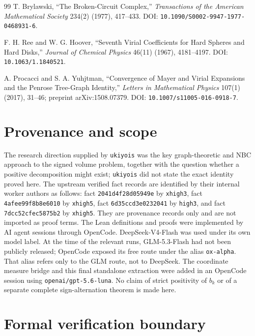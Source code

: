 \documentclass[11pt]{article}
\newcommand{\1}{\mathbf{1}}
\begin{document}
\begin{thebibliography}{99}
 T. Brylawski, ``The Broken-Circuit Complex,''
\emph{Transactions of the American Mathematical Society} 234(2) (1977),
417--433. DOI: \texttt{10.1090/S0002-9947-1977-0468931-6}.

 F. H. Ree and W. G. Hoover, ``Seventh Virial
Coefficients for Hard Spheres and Hard Disks,'' \emph{Journal of Chemical
Physics} 46(11) (1967), 4181--4197. DOI: \texttt{10.1063/1.1840521}.

 A. Procacci and S. A. Yuhjtman, ``Convergence
of Mayer and Virial Expansions and the Penrose Tree-Graph Identity,''
\emph{Letters in Mathematical Physics} 107(1) (2017), 31--46; preprint
arXiv:1508.07379. DOI: \texttt{10.1007/s11005-016-0918-7}.
\end{thebibliography}

\section{Provenance and scope}

The research direction supplied by \texttt{ukiyois} was the key graph-theoretic
and NBC approach to the signed volume problem, together with the question
whether a positive decomposition might exist; \texttt{ukiyois} did not state
the exact identity proved here.  The upstream verified fact records are
identified by their internal worker authors as follows: fact
\texttt{2041d4f28d05949e} by \texttt{xhigh3}, fact
\texttt{4afee99f8b8e6010} by \texttt{xhigh5}, fact
\texttt{6d35ccd3e0232041} by \texttt{high3}, and fact
\texttt{7dcc52cfec5875b2} by \texttt{xhigh5}.  They are provenance records
only and are not imported as proof terms.  The Lean definitions and proofs were
implemented by AI agent sessions through OpenCode.  DeepSeek-V4-Flash was used
under its own model label.  At the time of the relevant runs, GLM-5.3-Flash had
not been publicly released; OpenCode exposed its free route under the alias
\texttt{ox-alpha}.  That alias refers only to the GLM route, not to DeepSeek.
The coordinate measure bridge and this final standalone extraction were added
in an OpenCode session using \texttt{openai/gpt-5.6-luna}.  No claim of strict
positivity of $b_k$ or of a separate complete sign-alternation theorem is made
here.

\section{Formal verification boundary}
\end{document}

